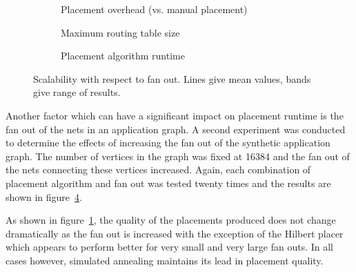 				\begin{figure}
					\center
					\begin{subfigure}{\linewidth}
						\center
						
						\caption{Placement overhead (vs. manual placement)}
						\label{fig:placement-scalability-fanout-quality}
					\end{subfigure}
					
					\vspace*{1em}
					
					\begin{subfigure}{\linewidth}
						\center
						
						\caption{Maximum routing table size}
						\label{fig:placement-scalability-fanout-entries}
					\end{subfigure}
					
					\vspace*{1em}
					
					\begin{subfigure}{\linewidth}
						\center
						
						\caption{Placement algorithm runtime}
						\label{fig:placement-scalability-fanout-runtime}
					\end{subfigure}
					
						\caption[Placer scalability with respect to fan out.]%
						{Scalability with respect to fan out. Lines give mean values,
						bands give range of results.}
					\label{fig:placement-scalability-fanout}
				\end{figure}
				
				Another factor which can have a significant impact on placement runtime
				is the fan out of the nets in an application graph. A second experiment
				was conducted to determine the effects of increasing the fan out of the
				synthetic application graph. The number of vertices in the graph was
				fixed at \num{16384} and the fan out of the nets connecting these
				vertices increased. Again, each combination of placement algorithm and
				fan out was tested twenty times and the results are shown in
				figure~\ref{fig:placement-scalability-fanout}.
				
				As shown in figure~\ref{fig:placement-scalability-fanout-quality}, the
				quality of the placements produced does not change dramatically as the
				fan out is increased with the exception of the Hilbert placer which
				appears to perform better for very small and very large fan outs. In
				all cases however, simulated annealing maintains its lead in placement
				quality.
				
